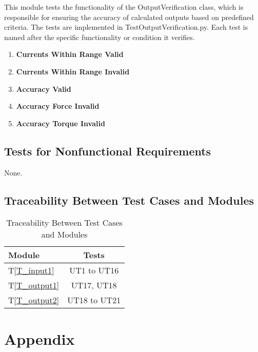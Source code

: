 \documentclass[12pt, titlepage]{article}
\newcommand{\tref}[1]{T\ref{#1}}
\newcommand{\UTthettnum}{UT\theuttnum}
\begin{document}
This module tests the functionality of the OutputVerification class, which is responsible for ensuring the accuracy of calculated outputs based on predefined criteria. The tests are implemented in TestOutputVerification.py. Each test is named after the specific functionality or condition it verifies.
\begin{enumerate}
  \item[\refstepcounter{uttnum} \UTthettnum:] \textbf{Currents Within Range Valid}
  \item[\refstepcounter{uttnum} \UTthettnum:] \textbf{Currents Within Range Invalid}
  \item[\refstepcounter{uttnum} \UTthettnum:] \textbf{Accuracy Valid}
  \item[\refstepcounter{uttnum} \UTthettnum:] \textbf{Accuracy Force Invalid}
  \item[\refstepcounter{uttnum} \UTthettnum:] \textbf{Accuracy Torque Invalid}
\end{enumerate}

\subsection{Tests for Nonfunctional Requirements}
None.

\subsection{Traceability Between Test Cases and Modules}

\begin{table}[h]
  \centering
  \caption{Traceability Between Test Cases and Modules}
  \vspace{3mm}
  \label{tab:my-table}
  \begin{tabular}{l|c}
  Module         & Tests \\ \hline
\tref{T_input1} & UT1 to UT16\\
\tref{T_output1} & UT17, UT18\\
\tref{T_output2} &  UT18 to UT21\\
  \end{tabular}
  \end{table}
				




\newpage

\section{Appendix}
\end{document}

